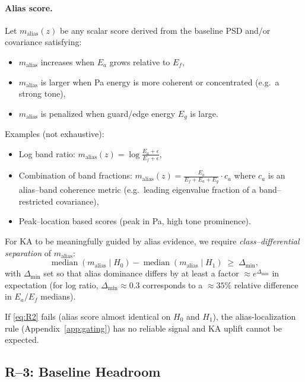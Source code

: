 \paragraph{Alias score.} Let $m_{\text{alias}}(z)$ be any scalar score derived from the baseline PSD and/or covariance satisfying:
\begin{itemize}[nosep]
  \item $m_{\text{alias}}$ increases when $E_a$ grows relative to $E_f$,
  \item $m_{\text{alias}}$ is larger when Pa energy is more coherent or concentrated (e.g.\ a strong tone),
  \item $m_{\text{alias}}$ is penalized when guard/edge energy $E_g$ is large.
\end{itemize}
Examples (not exhaustive):
\begin{itemize}[nosep]
  \item Log band ratio: $m_{\text{alias}}(z) = \log\frac{E_a+\epsilon}{E_f+\epsilon}$,
  \item Combination of band fractions: $m_{\text{alias}}(z) = \frac{E_a}{E_f+E_a+E_g} \cdot c_a$ where $c_a$ is an alias--band coherence metric (e.g.\ leading eigenvalue fraction of a band--restricted covariance),
  \item Peak--location based scores (peak in Pa, high tone prominence).
\end{itemize}

For KA to be meaningfully guided by alias evidence, we require \emph{class--differential separation} of $m_{\text{alias}}$:
\begin{equation}
\label{eq:R2}
\operatorname{median}\!\left(m_{\text{alias}}\mid H_0\right) - \operatorname{median}\!\left(m_{\text{alias}}\mid H_1\right) \;\ge\; \Delta_{\min},
\end{equation}
with $\Delta_{\min}$ set so that alias dominance differs by at least a factor $\approx e^{\Delta_{\min}}$ in expectation (for log ratio, $\Delta_{\min}\approx 0.3$ corresponds to a $\approx 35\%$ relative difference in $E_a/E_f$ medians).

If \eqref{eq:R2} fails (alias score almost identical on $H_0$ and $H_1$), the alias-localization rule (Appendix~\ref{app:gating}) has no reliable signal and KA uplift cannot be expected.

\subsection{R--3: Baseline Headroom}

